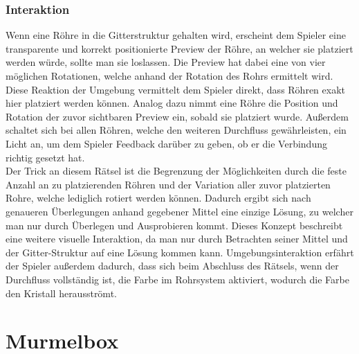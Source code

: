 \subsubsection{Interaktion}
Wenn eine Röhre in die Gitterstruktur gehalten wird, erscheint dem Spieler eine transparente und korrekt positionierte Preview der Röhre, an welcher sie platziert werden würde, sollte man sie loslassen. Die Preview hat dabei eine von vier möglichen Rotationen, welche anhand der Rotation des Rohrs ermittelt wird. Diese Reaktion der Umgebung vermittelt dem Spieler direkt, dass Röhren exakt hier platziert werden können. Analog dazu nimmt eine Röhre die Position und Rotation der zuvor sichtbaren Preview ein, sobald sie platziert wurde. Außerdem schaltet sich bei allen Röhren, welche den weiteren Durchfluss gewährleisten, ein Licht an, um dem Spieler Feedback darüber zu geben, ob er die Verbindung richtig gesetzt hat. 
\\ \noindent Der Trick an diesem Rätsel ist die Begrenzung der Möglichkeiten durch die feste Anzahl an zu platzierenden Röhren und der Variation aller zuvor platzierten Rohre, welche lediglich rotiert werden können. Dadurch ergibt sich nach genaueren Überlegungen anhand gegebener Mittel eine einzige Lösung, zu welcher man nur durch Überlegen und Ausprobieren kommt. Dieses Konzept beschreibt eine weitere visuelle Interaktion, da man nur durch Betrachten seiner Mittel und der Gitter-Struktur auf eine Lösung kommen kann. Umgebungsinteraktion erfährt der Spieler außerdem dadurch, dass sich beim Abschluss des Rätsels, wenn der Durchfluss vollständig ist, die Farbe im Rohr\-system aktiviert, wodurch die Farbe den Kristall herausströmt.
\newpage

\section{Murmelbox}
